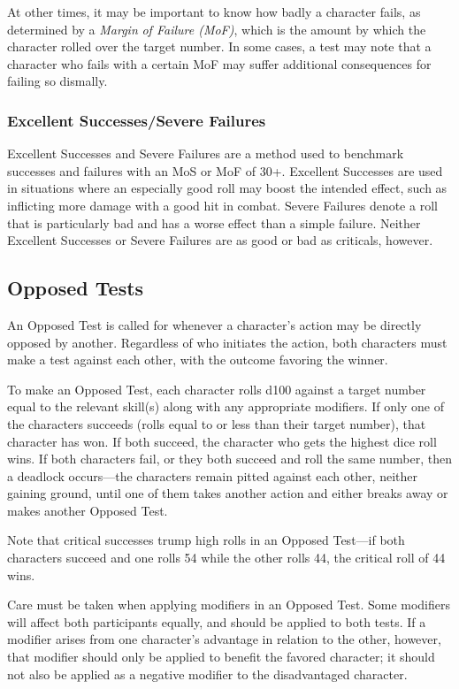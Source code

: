 At other times, it may be important to know how 
badly a character fails, as determined by a \textit{Margin }
\textit{of Failure (MoF)}, which is the amount by which the 
character rolled over the target number. In some cases, 
a test may note that a character who fails with a 
certain MoF may suffer additional consequences for 
failing so dismally.

\subsubsection{Excellent Successes/Severe Failures}

Excellent Successes and Severe Failures are a method 
used to benchmark successes and failures with an 
MoS or MoF of 30+. Excellent Successes are used in 
situations where an especially good roll may boost the 
intended effect, such as inflicting more damage with 
a good hit in combat. Severe Failures denote a roll 
that is particularly bad and has a worse effect than a 
simple failure. Neither Excellent Successes or Severe 
Failures are as good or bad as criticals, however.

\subsection{Opposed Tests}

An Opposed Test is called for whenever a character's 
action may be directly opposed by another. Regardless 
of who initiates the action, both characters must make 
a test against each other, with the outcome favoring 
the winner.

To make an Opposed Test, each character rolls 
d100 against a target number equal to the relevant 
skill(s) along with any appropriate modifiers. If only 
one of the characters succeeds (rolls equal to or less 
than their target number), that character has won. 
If both succeed, the character who gets the highest 
dice roll wins. If both characters fail, or they both 
succeed and roll the same number, then a deadlock 
occurs—the characters remain pitted against each 
other, neither gaining ground, until one of them takes 
another action and either breaks away or makes another
Opposed Test.

Note that critical successes trump high rolls in an 
Opposed Test—if both characters succeed and one rolls 
54 while the other rolls 44, the critical roll of 44 wins.

Care must be taken when applying modifiers in an 
Opposed Test. Some modifiers will affect both participants
equally, and should be applied to both tests. If
a modifier arises from one character's advantage in 
relation to the other, however, that modifier should 
only be applied to benefit the favored character; it 
should not also be applied as a negative modifier to 
the disadvantaged character.

